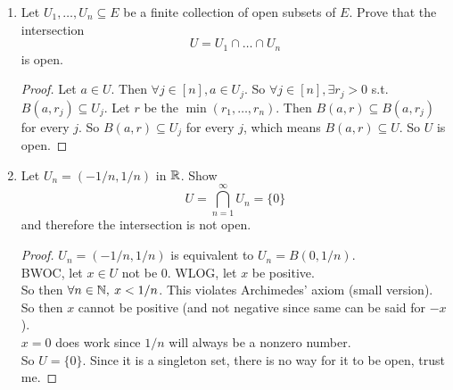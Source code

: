 \documentclass[14pt]{extarticle}
\begin{document}
\begin{enumerate}
		\item Let $U_1,\ldots, U_n \subseteq E$ be a finite collection of open subsets of $E$. Prove that the intersection 
		\[U = U_1 \cap \ldots \cap U_n\] is open.
		\begin{proof}
			Let $a \in U$. Then $\forall j \in [n], a \in U_j$. So $\forall j \in [n], \exists r_j > 0$ s.t. $ B(a,r_j) \subseteq U_j$. Let $r$ be the $\min(r_1,\ldots,r_n)$. Then $B(a,r) \subseteq B(a,r_j)$ for every $j$. So $B(a,r) \subseteq U_j$ for every $j$, which means $B(a,r) \subseteq U$. So $U$ is open.
		\end{proof}
		
		\item Let $U_n = (-1/n,1/n)$ in $\mathbb{R}$. Show \[U = \bigcap_{n=1}^{\infty}U_n = \{0\}\] and therefore the intersection is not open.
		\begin{proof}
			$U_n = (-1/n,1/n)$ is equivalent to $U_n = B(0,1/n)$.\\
			BWOC, let $x \in U$ not be $0$. WLOG, let $x$ be positive.\\
			So then $\forall n\in\mathbb{N},\medspace x<1/n$. This violates Archimedes’ axiom (small version). So then $x$ cannot be positive (and not negative since same can be said for $-x$).\\
			$x = 0$ does work since $1/n$ will always be a nonzero number.\\
			So $U = \{0\}$. Since it is a singleton set, there is no way for it to be open, trust me.
		\end{proof}
	\end{enumerate}
\end{document}
